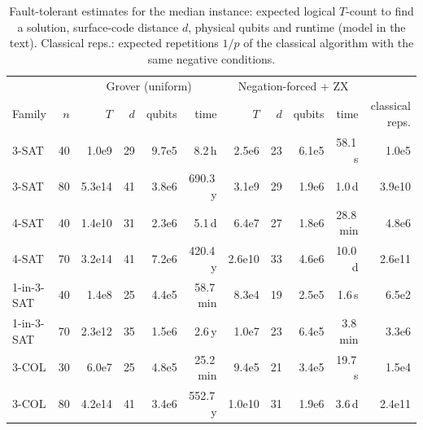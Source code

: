 \begin{table}[t]\centering\small
\caption{Fault-tolerant estimates for the median instance: expected logical $T$-count to find a solution, surface-code distance $d$, physical qubits and runtime (model in the text). Classical reps.: expected repetitions $1/p$ of the classical algorithm with the same negative conditions.}\label{tab:resources}
\begin{tabular}{lr|rrrr|rrrr|r}\toprule
 & & \multicolumn{4}{c|}{Grover (uniform)} & \multicolumn{4}{c|}{Negation-forced + ZX} & \\
Family & $n$ & $T$ & $d$ & qubits & time & $T$ & $d$ & qubits & time & classical reps.\\\midrule
3-SAT & 40 & 1.0e9 & 29 & 9.7e5 & 8.2\,h & 2.5e6 & 23 & 6.1e5 & 58.1\,s & 1.0e5\\
3-SAT & 80 & 5.3e14 & 41 & 3.8e6 & 690.3\,y & 3.1e9 & 29 & 1.9e6 & 1.0\,d & 3.9e10\\
4-SAT & 40 & 1.4e10 & 31 & 2.3e6 & 5.1\,d & 6.4e7 & 27 & 1.8e6 & 28.8\,min & 4.8e6\\
4-SAT & 70 & 3.2e14 & 41 & 7.2e6 & 420.4\,y & 2.6e10 & 33 & 4.6e6 & 10.0\,d & 2.6e11\\
1-in-3-SAT & 40 & 1.4e8 & 25 & 4.4e5 & 58.7\,min & 8.3e4 & 19 & 2.5e5 & 1.6\,s & 6.5e2\\
1-in-3-SAT & 70 & 2.3e12 & 35 & 1.5e6 & 2.6\,y & 1.0e7 & 23 & 6.4e5 & 3.8\,min & 3.3e6\\
3-COL & 30 & 6.0e7 & 25 & 4.8e5 & 25.2\,min & 9.4e5 & 21 & 3.4e5 & 19.7\,s & 1.5e4\\
3-COL & 80 & 4.2e14 & 41 & 3.4e6 & 552.7\,y & 1.0e10 & 31 & 1.9e6 & 3.6\,d & 2.4e11\\
\bottomrule\end{tabular}
\end{table}